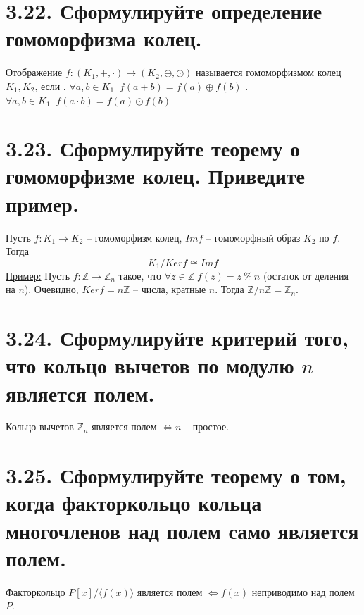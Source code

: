 \documentclass{article}
\begin{document}
\section*{\LARGE 3.22. Сформулируйте определение гомоморфизма колец. }
Отображение $f : (K_1, +, \cdot) \rightarrow (K_2, \oplus, \odot)$ называется гомоморфизмом колец $K_1, K_2$, если 
\newline{}. $\forall a,b \in K_1 \;\; f(a + b) = f(a) \oplus f(b)$
\newline{}. $\forall a,b \in K_1 \;\; f(a \cdot b) = f(a) \odot f(b)$

\section*{\LARGE 3.23. Сформулируйте теорему о гомоморфизме колец. Приведите пример. }
Пусть $f : K_1 \rightarrow K_2$ -- гомоморфизм колец, $Imf$ -- гомоморфный образ $K_2$ по $f$. Тогда
$$K_1 / Kerf \cong Imf$$
\underline{Пример:}
\newline Пусть $f : \mathbb{Z} \rightarrow \mathbb{Z}_n$ такое, что $\forall z \in \mathbb{Z} \; f(z) = z \:\%\: n$ (остаток от деления на $n$). Очевидно, $Kerf = n\mathbb{Z}$ -- числа, кратные $n$. Тогда $\mathbb{Z}/n\mathbb{Z} = \mathbb{Z}_n$.

\section*{\LARGE 3.24. Сформулируйте критерий того, что кольцо вычетов по модулю $n$ является полем. }
Кольцо вычетов $\mathbb{Z}_n$ является полем $\Leftrightarrow n$ -- простое. 

\section*{\LARGE 3.25. Сформулируйте теорему о том, когда факторкольцо кольца многочленов над полем само является полем. }
Факторкольцо $P[x] / \langle f(x)\rangle$ является полем $\Leftrightarrow f(x)$ неприводимо над полем $P$.
\end{document}
